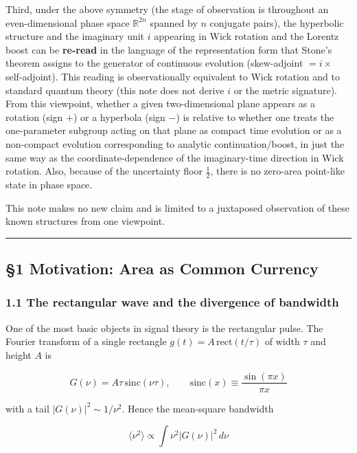 \documentclass[
]{article}
\begin{document}
Third, under the above symmetry (the stage of observation is throughout
an even-dimensional phase space \(\mathbb{R}^{2n}\) spanned by \(n\)
conjugate pairs), the hyperbolic structure and the imaginary unit \(i\)
appearing in Wick rotation and the Lorentz boost can be \textbf{re-read}
in the language of the representation form that Stone's theorem assigns
to the generator of continuous evolution (skew-adjoint \(=i\times\)
self-adjoint). This reading is observationally equivalent to Wick
rotation and to standard quantum theory (this note does not derive \(i\)
or the metric signature). From this viewpoint, whether a given
two-dimensional plane appears as a rotation (sign \(+\)) or a hyperbola
(sign \(-\)) is relative to whether one treats the one-parameter
subgroup acting on that plane as compact time evolution or as a
non-compact evolution corresponding to analytic continuation/boost, in
just the same way as the coordinate-dependence of the imaginary-time
direction in Wick rotation. Also, because of the uncertainty floor
\(\tfrac12\), there is no zero-area point-like state in phase space.

This note makes no new claim and is limited to a juxtaposed observation
of these known structures from one viewpoint.

\begin{center}\rule{0.5\linewidth}{0.5pt}\end{center}

\subsection{§1 Motivation: Area as Common
Currency}\label{motivation-area-as-common-currency}

\subsubsection{1.1 The rectangular wave and the divergence of
bandwidth}\label{the-rectangular-wave-and-the-divergence-of-bandwidth}

One of the most basic objects in signal theory is the rectangular pulse.
The Fourier transform of a single rectangle
\(g(t)=A\,\mathrm{rect}(t/\tau)\) of width \(\tau\) and height \(A\) is

\[G(\nu)=A\tau\,\mathrm{sinc}(\nu\tau),\qquad \mathrm{sinc}(x)\equiv\frac{\sin(\pi x)}{\pi x}\]

with a tail \(|G(\nu)|^2\sim 1/\nu^2\). Hence the mean-square bandwidth

\[\langle\nu^2\rangle\propto\int \nu^2|G(\nu)|^2\,d\nu\]
\end{document}
